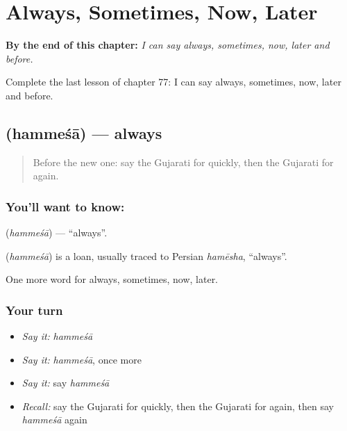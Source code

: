 
\chapter{Always, Sometimes, Now, Later}
\label{ch:gu-always-sometimes-now-later}

\begin{chapteropening}
\textbf{By the end of this chapter:} \emph{I can say always, sometimes, now, later and before.}

Complete the last lesson of chapter 77: I can say always, sometimes, now, later and before.
\end{chapteropening}

\section[\texorpdfstring{\gu{હંમેશા} (hammeśā)}{હંમેશા (hammeśā)}]{ (hammeśā) — always}

\label{lesson:GU-C77-always}



\begin{quote}
Before the new one: say the Gujarati for quickly, then the Gujarati for again.
\end{quote}

\subsection*{You'll want to know: }
\textbf{} (\emph{hammeśā}) — \textquotedblleft{}always\textquotedblright{}.

\begin{cousinweb}
\textbf{} (\emph{hammeśā}) is a loan, usually traced to Persian \emph{hamēsha}, \textquotedblleft{}always\textquotedblright{}.
\end{cousinweb}

\begin{grammarlens}[title={What you've built}]
One more word for always, sometimes, now, later.
\end{grammarlens}

\subsection*{Your turn}
\begin{itemize}
\raggedright
  \item \emph{Say it:} \emph{hammeśā}
  \item \emph{Say it:} \emph{hammeśā}, once more
  \item \emph{Say it:} say \emph{hammeśā}
  \item \emph{Recall:} say the Gujarati for quickly, then the Gujarati for again, then say \emph{hammeśā} again
\end{itemize}

